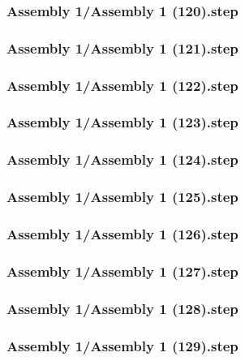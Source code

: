 \documentclass[a4paper,12pt]{article}
\begin{document}
\begin{lstlising}[language=C++]
\subsubsection{Assembly 1/Assembly 1 (120).step}

\subsubsection{Assembly 1/Assembly 1 (121).step}

\subsubsection{Assembly 1/Assembly 1 (122).step}

\subsubsection{Assembly 1/Assembly 1 (123).step}

\subsubsection{Assembly 1/Assembly 1 (124).step}

\subsubsection{Assembly 1/Assembly 1 (125).step}

\subsubsection{Assembly 1/Assembly 1 (126).step}

\subsubsection{Assembly 1/Assembly 1 (127).step}

\subsubsection{Assembly 1/Assembly 1 (128).step}

\subsubsection{Assembly 1/Assembly 1 (129).step}


\end{lstlising}
\end{document}
